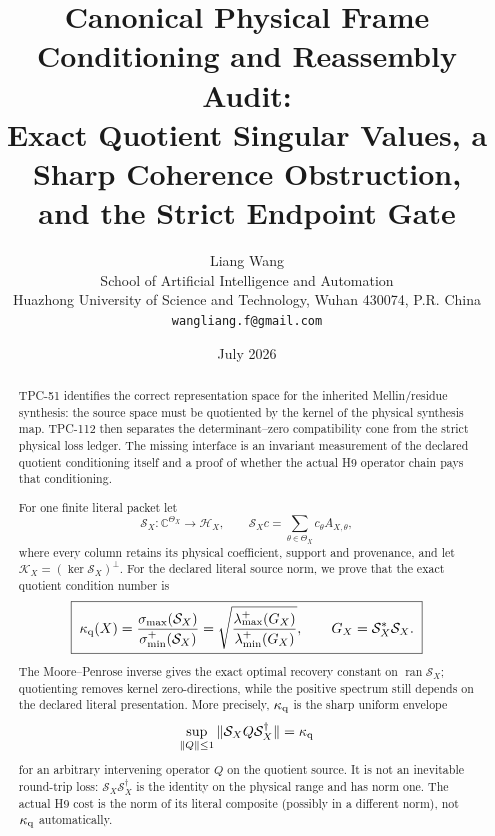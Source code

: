 \documentclass[11pt]{article}
\title{\textbf{Canonical Physical Frame Conditioning and Reassembly Audit:}\\
Exact Quotient Singular Values, a Sharp Coherence Obstruction,\\
and the Strict Endpoint Gate}
\author{Liang Wang\\
School of Artificial Intelligence and Automation\\
Huazhong University of Science and Technology, Wuhan 430074, P.R. China\\
\texttt{wangliang.f@gmail.com}}
\date{July 2026}
\theoremstyle{definition}
\theoremstyle{remark}
\newcommand{\C}{\mathbb C}
\newcommand{\Syn}{\mathcal S}
\begin{document}
\maketitle

\begin{abstract}
TPC-51 identifies the correct representation space for the inherited
Mellin/residue synthesis: the source space must be quotiented by the
kernel of the physical synthesis map.  TPC-112 then separates the
determinant--zero compatibility cone from the strict physical loss
ledger.  The missing interface is an invariant measurement of the
declared quotient conditioning itself and a proof of whether the
actual H9 operator chain pays that conditioning.

For one finite literal packet let
\[
 \Syn_X:\C^{\Theta_X}\longrightarrow\mathcal H_X,\qquad
 \Syn_Xc=\sum_{\theta\in\Theta_X}c_\theta A_{X,\theta},
\]
where every column retains its physical coefficient, support and
provenance, and let
\(\mathcal K_X=(\ker\Syn_X)^\perp\).  For the declared literal source
norm, we prove that the exact quotient condition number is
\[
 \boxed{\;
 \kappa_{\rm q}(X)
 =
 \frac{\sigma_{\max}(\Syn_X)}
      {\sigma_{\min}^{+}(\Syn_X)}
 =
 \sqrt{\frac{\lambda_{\max}^{+}(G_X)}
              {\lambda_{\min}^{+}(G_X)}} ,
 \qquad G_X=\Syn_X^*\Syn_X .\;}
\]
The Moore--Penrose inverse gives the exact optimal recovery constant
on \(\operatorname{ran}\Syn_X\); quotienting removes kernel
zero-directions, while the positive spectrum still depends on the
declared literal presentation.  More precisely,
\(\kappa_{\rm q}\) is the sharp uniform envelope
\[
 \sup_{\|Q\|\le1}
 \|\Syn_XQ\Syn_X^\dagger\|=\kappa_{\rm q}
\]
for an arbitrary intervening operator \(Q\) on the quotient source.
It is not an inevitable round-trip loss:
\(\Syn_X\Syn_X^\dagger\) is the identity on the physical range and
has norm one.  The actual H9 cost is the norm of its literal
composite (possibly in a different norm), not
\(\kappa_{\rm q}\) automatically.


\end{abstract}
\end{document}
